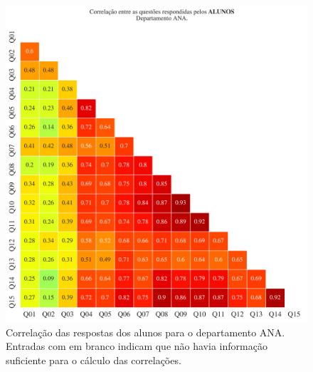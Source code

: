 \documentclass[a4paper,10pt]{article}
\begin{document}
\begin{figure}[h]
\centering
\includegraphics[width=0.999\linewidth]{matriz_corr__ANA_alunos.png}
\caption{\label{fig:corr_alunos}Correlação das respostas dos alunos para o departamento ANA. Entradas com em branco indicam que não havia informação suficiente para o cálculo das correlações.}
\end{figure}
\end{document}
